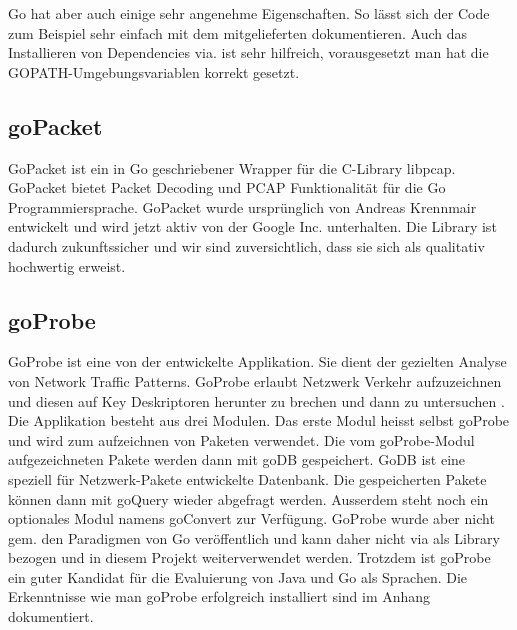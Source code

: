 Go hat aber auch einige sehr angenehme Eigenschaften. So lässt sich der Code zum Beispiel sehr einfach mit dem mitgelieferten  dokumentieren. Auch das Installieren von Dependencies via.  ist sehr hilfreich, vorausgesetzt man hat die GOPATH-Umgebungsvariablen korrekt gesetzt.

\subsection{goPacket}
GoPacket ist ein in Go geschriebener Wrapper für die C-Library libpcap. GoPacket bietet Packet Decoding und \acs{PCAP} Funktionalität für die Go Programmiersprache\cite[:4]{goPacket}. GoPacket wurde ursprünglich von Andreas Krennmair entwickelt und wird jetzt aktiv von der Google Inc. unterhalten. Die Library ist dadurch zukunftssicher und wir sind zuversichtlich, dass sie sich als qualitativ hochwertig erweist.

\subsection{goProbe}
GoProbe ist eine von der \osag{} entwickelte Applikation. Sie dient der gezielten Analyse von Network Traffic Patterns. GoProbe erlaubt Netzwerk Verkehr aufzuzeichnen und diesen auf Key Deskriptoren herunter zu brechen und dann zu untersuchen \cite[:2]{readme_goProbe}. 
Die Applikation besteht aus drei Modulen. Das erste Modul heisst selbst goProbe und wird zum aufzeichnen von Paketen verwendet. Die vom goProbe-Modul aufgezeichneten Pakete werden dann mit goDB gespeichert. GoDB ist eine speziell für Netzwerk-Pakete entwickelte Datenbank. Die gespeicherten Pakete können dann mit goQuery wieder abgefragt werden. Ausserdem steht noch ein optionales Modul namens goConvert zur Verfügung. GoProbe wurde aber nicht gem. den Paradigmen von Go veröffentlich und kann daher nicht via  als Library bezogen und in diesem Projekt weiterverwendet werden. Trotzdem ist goProbe ein guter Kandidat für die Evaluierung von Java und Go als Sprachen. Die Erkenntnisse wie man goProbe erfolgreich installiert sind im Anhang dokumentiert.